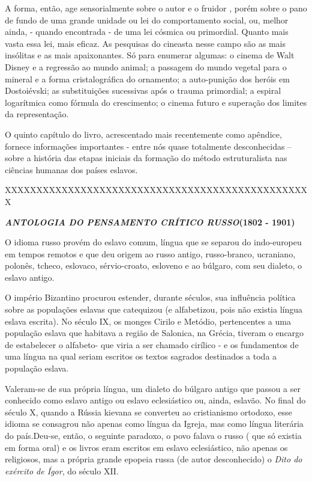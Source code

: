 A forma, então, age sensorialmente sobre o autor e o fruidor , porém
sobre o pano de fundo de uma grande unidade ou lei do comportamento
social, ou, melhor ainda, - quando encontrada - de uma lei cósmica ou
primordial. Quanto mais vasta essa lei, mais eficaz. As pesquisas do
cineasta nesse campo são as mais insólitas e as mais apaixonantes. Só
para enumerar algumas: o cinema de Walt Disney e a regressão ao mundo
animal; a passagem do mundo vegetal para o mineral e a forma
cristalográfica do ornamento; a auto-punição dos heróis em Dostoiévski;
as substituições sucessivas após o trauma primordial; a espiral
logarítmica como fórmula do crescimento; o cinema futuro e superação dos
limites da representação.

O quinto capítulo do livro, acrescentado mais recentemente como
apêndice, fornece informações importantes - entre nós quase totalmente
desconhecidas -- sobre a história das etapas iniciais da formação do
método estruturalista nas ciências humanas dos países eslavos.

XXXXXXXXXXXXXXXXXXXXXXXXXXXXXXXXXXXXXXXXXXXXXXXXX

\textbf{\emph{ANTOLOGIA DO PENSAMENTO CRÍTICO RUSSO}(1802 - 1901) }

O idioma russo provém do eslavo comum, língua que se separou do
indo-europeu em tempos remotos e que deu origem ao russo antigo,
russo-branco, ucraniano, polonês, tcheco, eslovaco, sérvio-croato,
esloveno e ao búlgaro, com seu dialeto, o eslavo antigo.

O império Bizantino procurou estender, durante séculos, sua influência
política sobre as populações eslavas que catequizou (e alfabetizou, pois
não existia língua eslava escrita). No século IX, os monges Cirilo e
Metódio, pertencentes a uma população eslava que habitava a região de
Salonica, na Grécia, tiveram o encargo de estabelecer o alfabeto- que
viria a ser chamado cirílico - e os fundamentos de uma língua na qual
seriam escritos os textos sagrados destinados a toda a população eslava.

Valeram-se de sua própria língua, um dialeto do búlgaro antigo que
passou a ser conhecido como eslavo antigo ou eslavo eclesiástico ou,
ainda, eslavão. No final do século X, quando a Rússia kievana se
converteu ao cristianismo ortodoxo, esse idioma se consagrou não apenas
como língua da Igreja, mas como língua literária do país.Deu-se, então,
o seguinte paradoxo, o povo falava o russo ( que só existia em forma
oral) e os livros eram escritos em eslavo eclesiástico, não apenas os
religiosos, mas a própria grande epopeia russa (de autor desconhecido) o
\emph{Dito do exército de Ígor}, do século XII.


